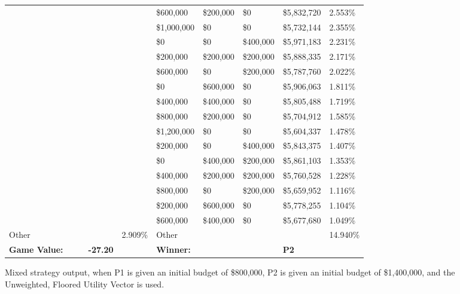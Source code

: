 \documentclass[11pt]{article}
\begin{document}
\begin{figure}
\begin{tabular}{ |p{1.0cm}p{1.0cm}p{1.0cm}p{2.0cm}|p{1.0cm}||p{1.0cm}p{1.0cm}p{1.0cm}p{2.0cm}|p{1.0cm}|}
& & & &                                            & \$600,000 & \$200,000 & \$0 & \$5,832,720 & 2.553\% \\
& & & &                                            & \$1,000,000 & \$0 & \$0 & \$5,732,144 & 2.355\% \\
& & & &                                            & \$0 & \$0 & \$400,000 & \$5,971,183 & 2.231\% \\
& & & &                                            & \$200,000 & \$200,000 & \$200,000 & \$5,888,335 & 2.171\% \\
& & & &                                            & \$600,000 & \$0 & \$200,000 & \$5,787,760 & 2.022\% \\
& & & &                                            & \$0 & \$600,000 & \$0 & \$5,906,063 & 1.811\% \\
& & & &                                            & \$400,000 & \$400,000 & \$0 & \$5,805,488 & 1.719\% \\
& & & &                                            & \$800,000 & \$200,000 & \$0 & \$5,704,912 & 1.585\% \\
& & & &                                            & \$1,200,000 & \$0 & \$0 & \$5,604,337 & 1.478\% \\
& & & &                                            & \$200,000 & \$0 & \$400,000 & \$5,843,375 & 1.407\% \\
& & & &                                            & \$0 & \$400,000 & \$200,000 & \$5,861,103 & 1.353\% \\
& & & &                                            & \$400,000 & \$200,000 & \$200,000 & \$5,760,528 & 1.228\% \\
& & & &                                            & \$800,000 & \$0 & \$200,000 & \$5,659,952 & 1.116\% \\
& & & &                                            & \$200,000 & \$600,000 & \$0 & \$5,778,255 & 1.104\% \\
& & & &                                            & \$600,000 & \$400,000 & \$0 & \$5,677,680 & 1.049\% \\
\hline
Other & & & & 2.909\%                               & Other & & & & 14.940\% \\
\hline
\small \textbf{Game Value:} &&& \small \textbf{-27.20} && \small \textbf{Winner:} &&& \small \textbf{P2}&\\
\hline
\end{tabular}
\caption{Mixed strategy output, when P1 is given an initial budget of \$800,000, P2 is given an initial budget of \$1,400,000, and the Unweighted, Floored Utility Vector is used.}
\label{8v14table.1}
\end{figure}
\end{document}
